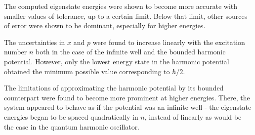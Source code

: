 \documentclass[11pt]{article}
\begin{document}
The computed eigenstate energies were shown to become more accurate
with smaller values of tolerance, up to a certain limit.
Below that limit, other sources of error were shown to be dominant,
especially for higher energies. 

The uncertainties in $x$ and $p$ were found to increase linearly
with the excitation number $n$ both in the case of the infinite well
and the bounded harmonic potential. However, only the lowest energy
state in the harmonic potential obtained the minimum possible value
corresponding to $\hbar/2$.

The limitations of approximating the harmonic potential by its 
bounded counterpart were found to become more prominent at higher
energies. There, the system appeared to behave as if the potential
was an infinite well - the eigenstate energies began to be spaced
quadratically in $n$, instead of linearly as would be the case in
the quantum harmonic oscillator.



\end{document}
